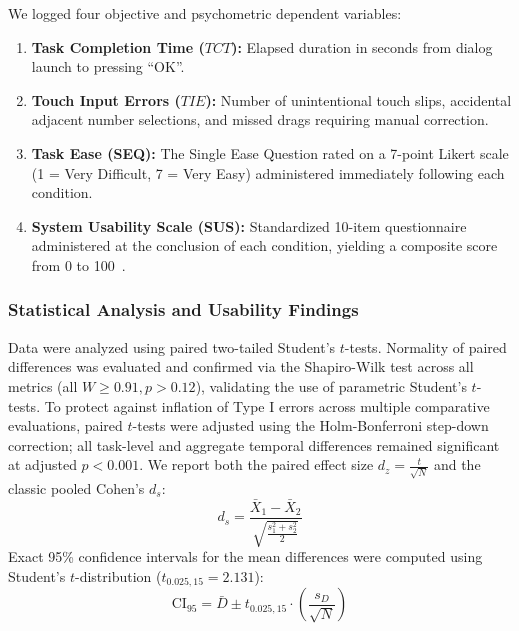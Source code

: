 \documentclass[11pt,a4paper]{article}
\begin{document}
We logged four objective and psychometric dependent variables:
\begin{enumerate}
    \item \textbf{Task Completion Time ($TCT$):} Elapsed duration in seconds from dialog launch to pressing ``OK''.
    \item \textbf{Touch Input Errors ($TIE$):} Number of unintentional touch slips, accidental adjacent number selections, and missed drags requiring manual correction.
    \item \textbf{Task Ease (SEQ):} The Single Ease Question rated on a 7-point Likert scale (1 = Very Difficult, 7 = Very Easy) administered immediately following each condition.
    \item \textbf{System Usability Scale (SUS):} Standardized 10-item questionnaire administered at the conclusion of each condition, yielding a composite score from 0 to 100~\cite{brooke1996sus}.
\end{enumerate}

\subsubsection{Statistical Analysis and Usability Findings}

Data were analyzed using paired two-tailed Student's $t$-tests. Normality of paired differences was evaluated and confirmed via the Shapiro-Wilk test across all metrics (all $W \ge 0.91, p > 0.12$), validating the use of parametric Student's $t$-tests. To protect against inflation of Type I errors across multiple comparative evaluations, paired $t$-tests were adjusted using the Holm-Bonferroni step-down correction; all task-level and aggregate temporal differences remained significant at adjusted $p < 0.001$. We report both the paired effect size $d_z = \frac{t}{\sqrt{N}}$ and the classic pooled Cohen's $d_s$:
\begin{equation}
    d_s = \frac{\bar{X}_1 - \bar{X}_2}{\sqrt{\frac{s_1^2 + s_2^2}{2}}}
\end{equation}
Exact 95\% confidence intervals for the mean differences were computed using Student's $t$-distribution ($t_{0.025, 15} = 2.131$):
\begin{equation}
    \text{CI}_{95} = \bar{D} \pm t_{0.025, 15} \cdot \left(\frac{s_D}{\sqrt{N}}\right)
\end{equation}
\end{document}

